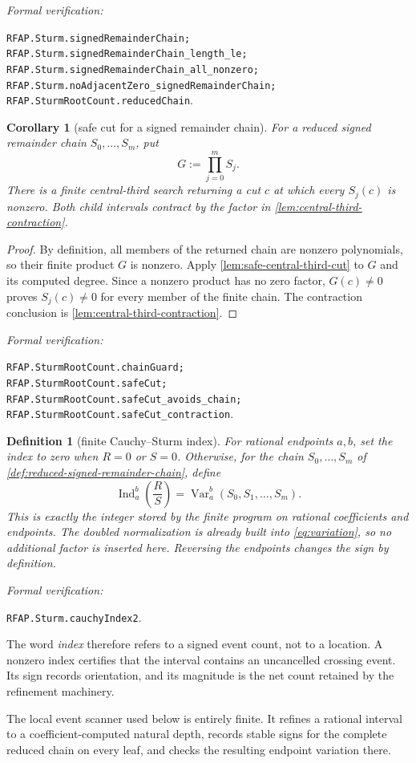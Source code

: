 \documentclass[11pt]{article}
\newtheorem{corollary}[theorem]{Corollary}
\newtheorem{definition}[theorem]{Definition}
\newcommand{\Ind}{\operatorname{Ind}}
\newcommand{\Var}{\operatorname{Var}}
\newcommand{\leanref}[1]{\par\smallskip\noindent
  \emph{Formal verification:}\par\nobreak
  {\raggedright\nolinkurl{#1}.\par}}
\begin{document}
\leanref{RFAP.Sturm.signedRemainderChain;
RFAP.Sturm.signedRemainderChain_length_le;
RFAP.Sturm.signedRemainderChain_all_nonzero;
RFAP.Sturm.noAdjacentZero_signedRemainderChain;
RFAP.SturmRootCount.reducedChain}

\begin{corollary}[safe cut for a signed remainder chain]
\label{cor:sturm-safe-cut}
For a reduced signed remainder chain $S_0,\ldots,S_m$, put
\[
                         G:=\prod_{j=0}^{m}S_j.
\]
There is a finite central-third search returning a cut $c$ at which every
$S_j(c)$ is nonzero.  Both child intervals contract by the factor in
\cref{lem:central-third-contraction}.
\end{corollary}

\begin{proof}
By definition, all members of the returned chain are nonzero polynomials,
so their finite product $G$ is nonzero.  Apply
\cref{lem:safe-central-third-cut} to $G$ and its computed degree.  Since a
nonzero product has no zero factor, $G(c)\ne0$ proves $S_j(c)\ne0$ for every
member of the finite chain.  The contraction conclusion is
\cref{lem:central-third-contraction}.
\end{proof}

\leanref{RFAP.SturmRootCount.chainGuard;
RFAP.SturmRootCount.safeCut;
RFAP.SturmRootCount.safeCut_avoids_chain;
RFAP.SturmRootCount.safeCut_contraction}

\begin{definition}[finite Cauchy--Sturm index]
\label{def:index}
For rational endpoints $a,b$, set the index to zero when $R=0$ or $S=0$.
Otherwise, for the chain $S_0,\ldots,S_m$ of
\cref{def:reduced-signed-remainder-chain}, define
\[
       \Ind_a^b\!\left(\frac{R}{S}\right)
          =\Var_a^b(S_0,S_1,\dots,S_m).
\]
This is exactly the integer stored by the finite program on rational
coefficients and endpoints.  The doubled
normalization is already built into \eqref{eq:variation}, so no additional
factor is inserted here.  Reversing the endpoints changes the sign by
definition.
\end{definition}

\leanref{RFAP.Sturm.cauchyIndex2}

The word \emph{index} therefore refers to a signed event count, not to a
location.  A nonzero index certifies that the interval contains an
uncancelled crossing event.  Its sign records orientation, and its magnitude
is the net count retained by the refinement machinery.

The local event scanner used below is entirely finite.  It
refines a rational interval to a coefficient-computed natural depth, records
stable signs for the complete reduced chain on every leaf, and checks the
resulting endpoint variation there.
\end{document}
